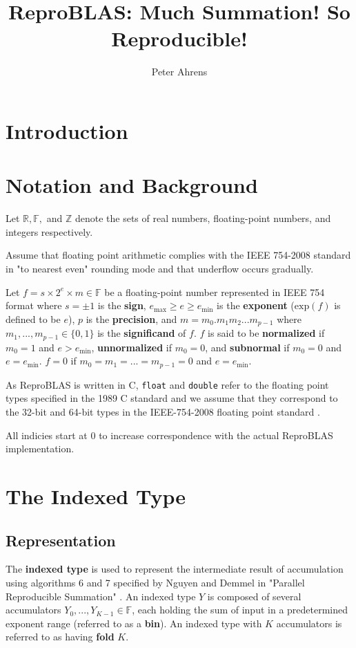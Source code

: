 \documentclass[12pt]{article}
\author{Peter Ahrens}
\title{ReproBLAS: Much Summation! So Reproducible!}
\providecommand{\R}{\ensuremath{\mathbb{R}}}
\providecommand{\F}{\ensuremath{\mathbb{F}}}
\providecommand{\Z}{\ensuremath{\mathbb{Z}}}
\providecommand{\exp}{\ensuremath{\text{exp}}}
\providecommand{\min}{\ensuremath{\text{min}}}
\providecommand{\max}{\ensuremath{\text{max}}}
\theoremstyle{plain}
\begin{document}
\noindent
\maketitle
\newpage
\section{Introduction}

\section{Notation and Background}
  Let $\R, \F, $ and $\Z$ denote the sets of real numbers, floating-point numbers, and integers respectively.

  Assume that floating point arithmetic complies with the IEEE 754-2008 standard in "to nearest even" rounding mode and that underflow occurs gradually.

  Let $f = s \times 2^e \times m \in \F$ be a floating-point number represented in IEEE 754 format where $s = \pm 1$ is the \textbf{sign}, $e_{\max} \geq e \geq e_{\min}$ is the \textbf{exponent} ($\exp(f)$ is defined to be $e$), $p$ is the \textbf{precision}, and $m = m_0.m_1m_2...m_{p-1}$ where $m_1, ..., m_{p - 1} \in \{0, 1\}$ is the \textbf{significand} of $f$. $f$ is said to be \textbf{normalized} if $m_0 = 1$ and $e > e_{\min}$, \textbf{unnormalized} if $m_0 = 0$, and \textbf{subnormal} if $m_0 = 0$ and $e = e_{\min}$. $f = 0$ if $m_0 = m_1 = ... = m_{p - 1} = 0$ and $e = e_{\min}$.

  As ReproBLAS is written in C, \verb|float| and \verb|double| refer to the floating point types specified in the 1989 C standard \cite{c89} and we assume that they correspond to the 32-bit and 64-bit types in the IEEE-754-2008 floating point standard \cite{ieee754}. 

  All indicies start at 0 to increase correspondence with the actual ReproBLAS implementation.

\section{The Indexed Type}
  \subsection{Representation}
    The \textbf{indexed type} is used to represent the intermediate result of accumulation using algorithms 6 and 7 specified by Nguyen and Demmel in "Parallel Reproducible Summation" \cite{repsum}.
    An indexed type $Y$ is composed of several accumulators $Y_0, ..., Y_{K - 1} \in \F$, each holding the sum of input in a predetermined exponent range (referred to as a \textbf{bin}). An indexed type with $K$ accumulators is referred to as having \textbf{fold} $K$.
\end{document}
